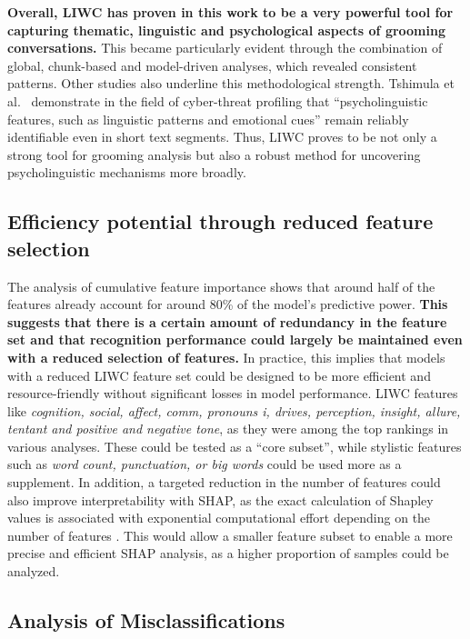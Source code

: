 \textbf{Overall, LIWC has proven in this work to be a very powerful tool for capturing thematic, linguistic and psychological aspects of grooming conversations.} This became particularly evident through the combination of global, chunk-based and model-driven analyses, which revealed consistent patterns. Other studies also underline this methodological strength. Tshimula et al.~\cite{tshimula2024psychologicalprofilingcybersecuritylook} demonstrate in the field of cyber-threat profiling that “psycholinguistic features, such as linguistic patterns and emotional cues” remain reliably identifiable even in short text segments. Thus, LIWC proves to be not only a strong tool for grooming analysis but also a robust method for uncovering psycholinguistic mechanisms more broadly. 


\subsection{Efficiency potential through reduced feature selection}

The analysis of cumulative feature importance shows that around half of the features already account for around 80\% of the model's predictive power. \textbf{This suggests that there is a certain amount of redundancy in the feature set and that recognition performance could largely be maintained even with a reduced selection of features.} In practice, this implies that models with a reduced LIWC feature set could be designed to be more efficient and resource-friendly without significant losses in model performance. LIWC features like \textit{cognition, social, affect, comm, pronouns i, drives, perception, insight, allure, tentant and positive and negative tone}, as they were among the top rankings in various analyses. These could be tested as a “core subset”, while stylistic features such as \textit{word count, punctuation, or big words} could be used more as a supplement. In addition, a targeted reduction in the number of features could also improve interpretability with SHAP, as the exact calculation of Shapley values is associated with exponential computational effort depending on the number of features \cite{fryer2021shapley}. This would allow a smaller feature subset to enable a more precise and efficient SHAP analysis, as a higher proportion of samples could be analyzed.


\subsection{Analysis of Misclassifications}

